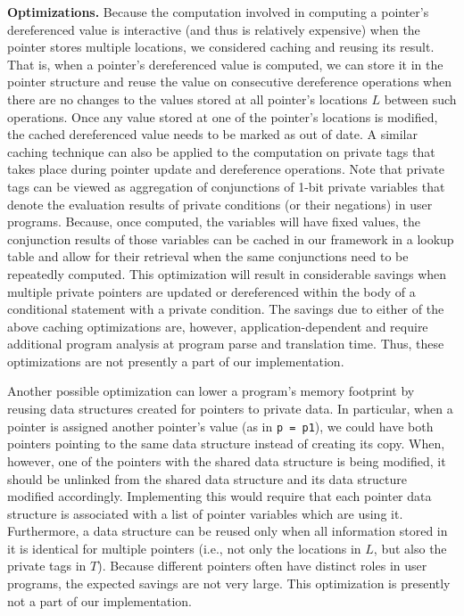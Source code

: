 \documentclass[11pt]{article}
\begin{document}
\medskip \noindent \textbf{Optimizations.} Because the computation involved
in computing a pointer's dereferenced value is interactive (and thus is
relatively expensive) when the pointer stores multiple locations, we
considered caching and reusing its result. That is, when a pointer's
dereferenced value is computed, we can store it in the pointer structure and
reuse the value on consecutive dereference operations when there are no
changes to the values stored at all pointer's locations $L$ between such
operations. Once any value stored at one of the pointer's locations is
modified, the cached dereferenced value needs to be marked as out of date. A
similar caching technique can also be applied to the computation on private
tags that takes place during pointer update and dereference operations. Note
that private tags can be viewed as aggregation of conjunctions of 1-bit
private variables that denote the evaluation results of private conditions
(or their negations) in user programs. Because, once computed, the variables
will have fixed values, the conjunction results of those variables can be
cached in our framework in a lookup table and allow for their retrieval when
the same conjunctions need to be repeatedly computed. This optimization will
result in considerable savings when multiple private pointers are updated or
dereferenced within the body of a conditional statement with a private
condition. The savings due to either of the above caching optimizations are,
however, application-dependent and require additional program analysis at
program parse and translation time. Thus, these optimizations are not
presently a part of our implementation.

Another possible optimization can lower a program's memory footprint by
reusing data structures created for pointers to private data. In particular,
when a pointer is assigned another pointer's value (as in \texttt{p = p1}),
we could have both pointers pointing to the same data structure instead of
creating its copy. When, however, one of the pointers with the shared data
structure is being modified, it should be unlinked from the shared data
structure and its data structure modified accordingly. Implementing this
would require that each pointer data structure is associated with a list of
pointer variables which are using it. Furthermore, a data structure can be
reused only when all information stored in it is identical for multiple
pointers (i.e., not only the locations in $L$, but also the private tags in
$T$). Because different pointers often have distinct roles in user programs,
the expected savings are not very large. This optimization is presently not
a part of our implementation.
\end{document}
